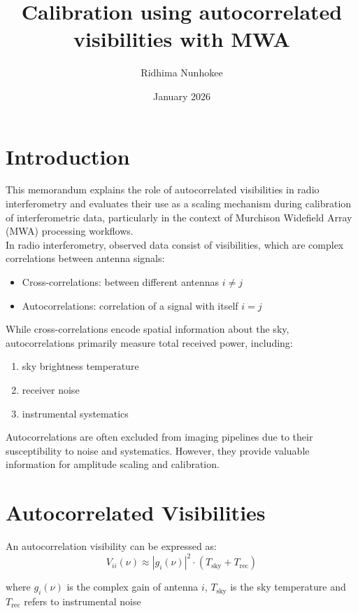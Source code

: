 \documentclass{article}
\title{Calibration using autocorrelated visibilities with MWA}
\author{Ridhima Nunhokee}
\date{January 2026}
\begin{document}
\maketitle

\section{Introduction}

This memorandum explains the role of autocorrelated visibilities in radio interferometry and evaluates their use as a scaling mechanism during calibration of interferometric data, particularly in the context of Murchison Widefield Array (MWA) processing workflows.\\


In radio interferometry, observed data consist of visibilities, which are complex correlations between antenna signals:
\begin{itemize}
\item Cross-correlations: between different antennas $i ≠ j$\\
\item Autocorrelations: correlation of a signal with itself $i = j$
\end{itemize}


While cross-correlations encode spatial information about the sky, autocorrelations primarily measure total received power, including:
\begin{enumerate}
    \item sky brightness temperature
    \item receiver noise
    \item instrumental systematics
\end{enumerate}
Autocorrelations are often excluded from imaging pipelines due to their susceptibility to noise and systematics. However, they provide valuable information for amplitude scaling and calibration.

\section{Autocorrelated Visibilities}
An autocorrelation visibility can be expressed as:
\begin{equation}
V_{ii}(\nu) \approx |g_i(\nu)|^2 \cdot (T_{\text{sky}} + T_{\text{rec}})
\end{equation}

where $g_i(\nu)$ is the  complex gain of antenna $i$, $T_{\text{sky}}$ is the sky temperature and $T_{\text{rec}}$ refers to instrumental noise
\end{document}
